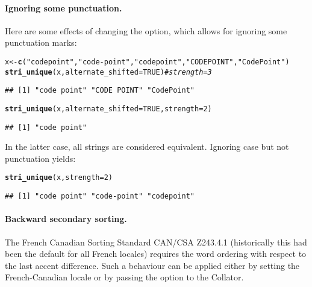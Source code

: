 \documentclass[nojss]{jss}\usepackage[]{graphicx}\usepackage[]{xcolor}
\makeatletter
\newcommand{\hlnum}[1]{\textcolor[rgb]{0.686,0.059,0.569}{#1}}%
\newcommand{\hlstr}[1]{\textcolor[rgb]{0.192,0.494,0.8}{#1}}%
\newcommand{\hlcom}[1]{\textcolor[rgb]{0.678,0.584,0.686}{\textit{#1}}}%
\newcommand{\hlstd}[1]{\textcolor[rgb]{0.345,0.345,0.345}{#1}}%
\newcommand{\hlkwb}[1]{\textcolor[rgb]{0.69,0.353,0.396}{#1}}%
\newcommand{\hlkwc}[1]{\textcolor[rgb]{0.333,0.667,0.333}{#1}}%
\newcommand{\hlkwd}[1]{\textcolor[rgb]{0.737,0.353,0.396}{\textbf{#1}}}%
\newenvironment{kframe}{%
 \def\at@end@of@kframe{}%
 \ifinner\ifhmode%
  \def\at@end@of@kframe{\end{minipage}}%
  \begin{minipage}{\columnwidth}%
 \fi\fi%
 \def\FrameCommand##1{\hskip\@totalleftmargin \hskip-\fboxsep
 \colorbox{shadecolor}{##1}\hskip-\fboxsep
     \hskip-\linewidth \hskip-\@totalleftmargin \hskip\columnwidth}%
 \MakeFramed {\advance\hsize-\width
   \@totalleftmargin\z@ \linewidth\hsize
   \@setminipage}}%
 {\par\unskip\endMakeFramed%
 \at@end@of@kframe}
\newenvironment{knitrout}{}{} %
\makeatother
\begin{document}
\paragraph{Ignoring some punctuation.}
Here are some effects of changing the   option,
which allows for ignoring some punctuation marks:

\begin{knitrout}
\color{fgcolor}\begin{kframe}
\begin{alltt}
\hlstd{x} \hlkwb{<-} \hlkwd{c}\hlstd{(}\hlstr{"code point"}\hlstd{,} \hlstr{"code-point"}\hlstd{,} \hlstr{"codepoint"}\hlstd{,} \hlstr{"CODE POINT"}\hlstd{,} \hlstr{"CodePoint"}\hlstd{)}
\hlkwd{stri_unique}\hlstd{(x,} \hlkwc{alternate_shifted}\hlstd{=}\hlnum{TRUE}\hlstd{)}  \hlcom{# strength=3}
\end{alltt}
\begin{verbatim}
## [1] "code point" "CODE POINT" "CodePoint"
\end{verbatim}
\begin{alltt}
\hlkwd{stri_unique}\hlstd{(x,} \hlkwc{alternate_shifted}\hlstd{=}\hlnum{TRUE}\hlstd{,} \hlkwc{strength}\hlstd{=}\hlnum{2}\hlstd{)}
\end{alltt}
\begin{verbatim}
## [1] "code point"
\end{verbatim}
\end{kframe}
\end{knitrout}

In the latter case, all strings are considered equivalent.
Ignoring case but not punctuation yields:

\begin{knitrout}
\color{fgcolor}\begin{kframe}
\begin{alltt}
\hlkwd{stri_unique}\hlstd{(x,} \hlkwc{strength}\hlstd{=}\hlnum{2}\hlstd{)}
\end{alltt}
\begin{verbatim}
## [1] "code point" "code-point" "codepoint"
\end{verbatim}
\end{kframe}
\end{knitrout}





\paragraph{Backward secondary sorting.}
The French Canadian Sorting Standard CAN/CSA Z243.4.1 (historically this had been
the default for all French locales) requires the word ordering with respect
to  the last accent difference. Such a behaviour can be applied
either by setting the French-Canadian locale or by passing the 
option to the Collator.
\end{document}
